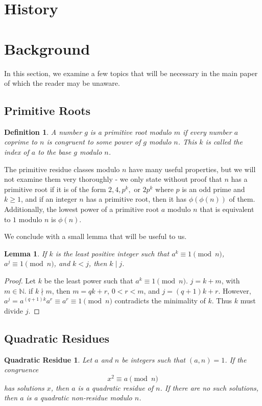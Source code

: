 \documentclass{article}
\newtheorem*{lemma}{Lemma}
\newtheorem*{definition}{Definition}
\begin{document}
\section*{History}\label{History}
  

\section*{Background}\label{Background}

In this section, we examine a few topics that will be necessary in the main paper of which the reader may be unaware. 


\subsection*{Primitive Roots}
\begin{definition}
A number $g$ is a \textit{primitive root} modulo $m$ if every number $a$ coprime to $n$ is congruent to some power of $g$ modulo $n$. This $k$ is called the index of $a$ to the base $g$ modulo $n$.
\end{definition}
\par The primitive residue classes modulo $n$ have many useful properties, but we will not examine them very thoroughly - we only state without proof that $n$ has a primitive root if it is of the form $2, 4, p^k, \text{ or } 2p^k$ where $p$ is an odd prime and $k \geq 1$, and if an integer $n$ has a primitive root, then it has $\phi(\phi(n))$ of them. Additionally, the lowest power of a primitive root $a$ modulo $n$ that is equivalent to $1$ modulo $n$ is $\phi(n)$.

We conclude with a small lemma that will be useful to us.
\begin{lemma}
If $k$ is the least positive integer such that $a^k \equiv 1 \pmod n$, $a^j \equiv 1 \pmod n$, and $k < j$, then $k \mid j$.
\end{lemma}
\begin{proof}
Let $k$ be the least power such that $a^k \equiv 1 \pmod n$. $j = k + m$, with $m \in \mathbb N$. if $k \nmid m$, then $m = qk+ r$, $ 0 < r < m$, and $j = (q+1)k + r$. However, $a^j = a^{(q+1)k}a^r \equiv a^r \equiv 1 \pmod n$ contradicts the minimality of $k$. Thus $k$ must divide $j$.
\end{proof}
\subsection*{Quadratic Residues}
\newtheorem*{quadraticresiduedefinition}{Quadratic Residue}
\begin{quadraticresiduedefinition}
Let $a$ and $n$ be integers such that $(a,n) = 1$. If the congruence
	$$x^2 \equiv a \pmod n$$
has solutions $x$, then $a$ is a \textit{quadratic residue} of $n$. If there are no such solutions, then $a$ is a \textit{quadratic non-residue} modulo $n$.
\end{quadraticresiduedefinition}
\end{document}
